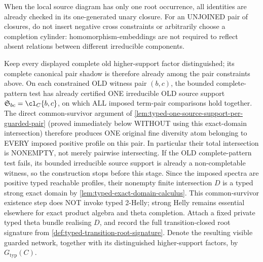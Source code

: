 \begin{construction}
When the local source diagram
has only one root occurrence,
all identities are already
checked in its one-generated
unary closure. For an UNJOINED
pair of closures, do not
insert negative cross
constraints or arbitrarily
choose a completion cylinder:
homomorphism-embeddings are
not required to reflect
absent relations between
different irreducible
components.

Keep every displayed complete old higher-support factor distinguished; its
complete canonical pair shadow is therefore already among the pair constraints
above.  On each constrained OLD witness pair \((b,c)\), the bounded
complete-pattern test has already certified ONE irreducible OLD source
support \(\mathfrak S_{bc}=\cl_C\{b,c\}\), on which ALL imposed term-pair
comparisons hold together.  The direct common-survivor argument of
\cref{lem:typed-one-source-support-per-guarded-pair} (proved immediately
below WITHOUT using this exact-domain intersection) therefore produces
ONE original fine diversity atom belonging to EVERY imposed positive
profile on this pair.  In particular their total intersection is
NONEMPTY, not merely pairwise intersecting.  If the OLD complete-pattern
test fails, its bounded irreducible source support is already a
non-completable witness, so the construction stops before this stage.
Since the imposed spectra are positive typed reachable profiles,
their nonempty finite intersection \(D\) is a typed strong exact domain
by \cref{lem:typed-exact-domain-calculus}.  This common-survivor
existence step does NOT invoke typed 2-Helly; strong Helly remains
essential elsewhere for exact product algebra and theta completion.
Attach a fixed private typed theta bundle realising \(D\), and record
the full transition-closed root signature
from \cref{def:typed-transition-root-signature}.  Denote the resulting
visible guarded network, together with its distinguished higher-support
factors, by \(G_{\mathrm{typ}}(C)\).
\end{construction}

